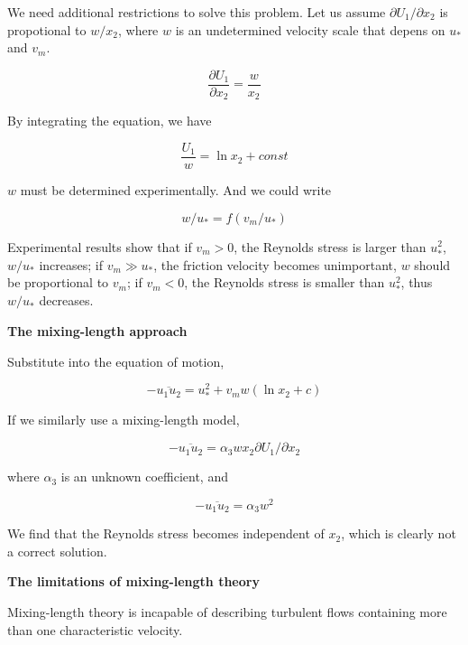 \documentclass{article}
\begin{document}
We need additional restrictions to solve this problem. Let us assume $\partial U_1/\partial x_2$ is propotional to  $w/x_2$, where $w$ is an undetermined velocity scale that depens on $u_*$ and $v_m$.

\begin{equation*}
    \frac{\partial U_1}{\partial x_2}=\frac{w}{x_2}
\end{equation*}

By integrating the equation, we have

\begin{equation*}
    \frac{U_1}{w}=\ln x_2 +const
\end{equation*}

$w$ must be determined experimentally. And we could write

\begin{equation*}
    w/u_*=f(v_m/u_*)
\end{equation*}

Experimental results show that if $v_m>0$, the Reynolds stress is larger than $u_*^2$, $w/u_*$ increases; if $v_m\gg u_*$, the friction velocity becomes unimportant, $w$ should be proportional to $v_m$; if $v_m<0$, the Reynolds stress is smaller than $u_*^2$, thus $w/u_*$ decreases.

\textbf{The mixing-length approach}

Substitute into the equation of motion,

\begin{equation*}
    -\overline{u_1 u_2}=u_*^2+v_m w (\ln x_2 +c)
\end{equation*}

If we similarly use a mixing-length model,

\begin{equation*}
    -\overline{u_1 u_2}=\alpha_3 w x_2 \partial U_1/\partial x_2
\end{equation*}

where $\alpha_3$ is an unknown coefficient, and

\begin{equation*}
    -\overline{u_1 u_2}=\alpha_3 w^2
\end{equation*}

We find that the Reynolds stress becomes independent of $x_2$, which is clearly not a correct solution.

\textbf{The limitations of mixing-length theory}

Mixing-length theory is incapable of describing turbulent flows containing more than one characteristic velocity.


\ifx\allfiles\undefined         %
\end{document}
